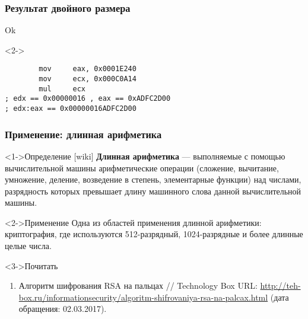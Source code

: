 \documentclass[pdf,9pt,aspectratio=169]{beamer}
\begin{document}
\begin{frame}[fragile]\frametitle{Результат двойного размера}
  \begin{exampleblock}{Ok}
    \begin{center}
    \end{center}
  \end{exampleblock}
  \begin{exampleblock}<2->{}
    \begin{verbatim}
        mov     eax, 0x0001E240
        mov     ecx, 0x000C0A14
        mul     ecx
; edx == 0x00000016 , eax == 0xADFC2D00
; edx:eax == 0x00000016ADFC2D00
    \end{verbatim}
  \end{exampleblock}
\end{frame}

\begin{frame}[fragile]\frametitle{Применение: длинная арифметика}
  \begin{block}<1->{Определение [wiki]}
\textbf{Длинная арифметика} --- выполняемые с помощью вычислительной машины арифметические операции (сложение, вычитание, умножение, деление, возведение в степень, элементарные функции) над числами, разрядность которых превышает длину машинного слова данной вычислительной машины.
  \end{block}

  \begin{block}<2->{Применение}
Одна из областей применения длинной арифметики: криптография, где используются 512-разрядный, 1024-разрядные и более длинные целые числа.
  \end{block}

  \begin{block}<3->{Почитать}
    \begin{enumerate}
      \item Алгоритм шифрования RSA на пальцах // Technology Box URL: \url{http://teh-box.ru/informationsecurity/algoritm-shifrovaniya-rsa-na-palcax.html} (дата обращения: 02.03.2017).
    \end{enumerate}
  \end{block}
\end{frame}
\end{document}
